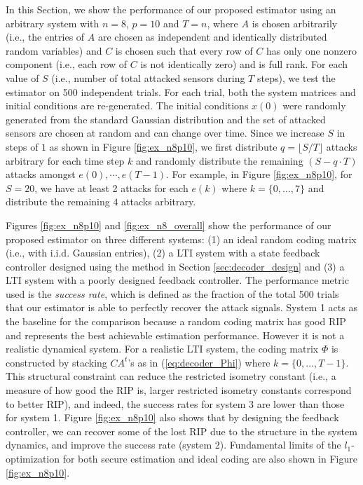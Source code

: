 \documentclass[../../thesis.tex]{subfiles}
\begin{document}
In this Section, we show the performance of our proposed estimator using an arbitrary system with $n=8$, $p=10$ and $T=n$, where $A$ is chosen arbitrarily (i.e., the entries of $A$ are chosen as independent and identically distributed random variables) and $C$ is chosen such that every row of $C$ has only one nonzero component (i.e., each row of $C$ is not identically zero) and is full rank. 
For each value of $S$ (i.e., number of total attacked sensors during $T$ steps), we test the estimator on 500 independent trials. For each trial, both the system matrices and initial conditions are re-generated. The initial conditions $x(0)$ were randomly generated from the standard Gaussian distribution and the set of attacked sensors are chosen at random and can change over time. Since we increase $S$ in steps of $1$ as shown in Figure \ref{fig:ex_n8p10}, 
we first distribute $q= \lfloor S/T \rfloor$ attacks arbitrary for each time step $k$ and randomly distribute the remaining $(S-q\cdot T)$ attacks amongst $e(0),\cdots, e(T-1)$. For example, in Figure \ref{fig:ex_n8p10}, for $S=20$, we have at least 2 attacks for each $e(k)$ where $k=\{0,...,7\}$ and distribute the remaining $4$ attacks arbitrary. 

Figures \ref{fig:ex_n8p10} and \ref{fig:ex_n8_overall} show the performance of our proposed estimator on three different systems: (1) an ideal random coding matrix (i.e., with i.i.d. Gaussian entries), (2) a LTI system with a state feedback controller designed using the method in Section \ref{sec:decoder_design} and (3) a LTI system with a poorly designed feedback controller. 
The performance metric used is the \textit{success rate}, which is defined as the fraction of the total 500 trials that our estimator is able to perfectly recover the attack signals.
System 1 acts as the baseline for the comparison because a random coding matrix has good RIP and represents the best achievable estimation performance. However it is not a realistic dynamical system. For a realistic LTI system, the coding matrix $\Phi$ is constructed by stacking $CA^{t}$'s as in (\ref{eq:decoder_Phi}) where $k=\{ 0, ..., T-1\}$. This structural constraint can reduce the restricted isometry constant (i.e., a measure of how good the RIP is, larger restricted isometry constants correspond to better RIP), and indeed, the success rates for system 3 are lower than those for system 1. Figure \ref{fig:ex_n8p10} also shows that by designing the feedback controller, we can recover some of the lost RIP due to the structure in the system dynamics, and improve the success rate (system 2).
Fundamental limits of the $l_1$-optimization for both secure estimation and ideal coding are also shown in Figure \ref{fig:ex_n8p10}. 
\end{document}

